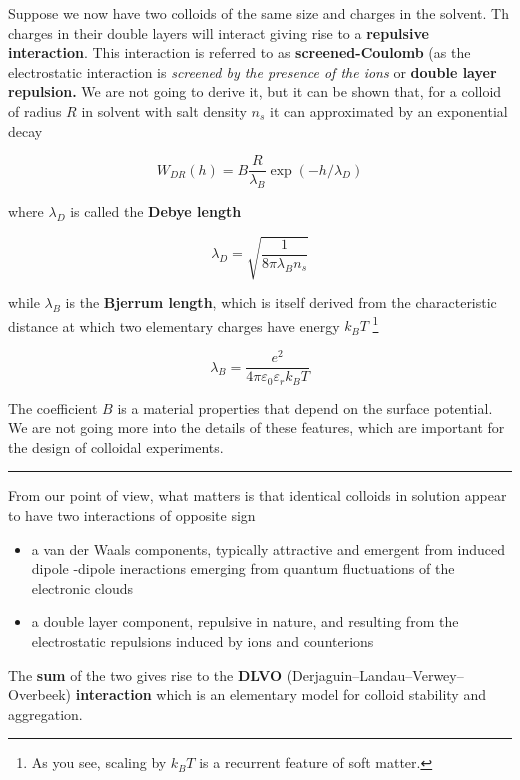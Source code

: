 \documentclass[
  letterpaper,
  enabledeprecatedfontcommands]{report}
\begin{document}
Suppose we now have two colloids of the same size and charges in the
solvent. Th charges in their double layers will interact giving rise to
a \textbf{repulsive interaction}. This interaction is referred to as
\textbf{screened-Coulomb} (as the electrostatic interaction is
\emph{screened by the presence of the ions} or \textbf{double layer
repulsion.} We are not going to derive it, but it can be shown that, for
a colloid of radius \(R\) in solvent with salt density \(n_s\) it can
approximated by an exponential decay

\[
W_{DR}(h) = B\dfrac{R}{\lambda_B}\exp{(-h/\lambda_D)}
\]

where \(\lambda_D\) is called the \textbf{Debye length}

\[
\lambda_D = \sqrt{\dfrac{1}{8\pi\lambda_B n_s}}
\]

while \(\lambda_B\) is the \textbf{Bjerrum length}, which is itself
derived from the characteristic distance at which two elementary charges
have energy \(k_B T\) \footnote{As you see, scaling by \(k_B T\) is a
  recurrent feature of soft matter.}

\[
\lambda_B = \dfrac{e^2}{4\pi \varepsilon_0\varepsilon_r k_B T}
\]

The coefficient \(B\) is a material properties that depend on the
surface potential. We are not going more into the details of these
features, which are important for the design of colloidal experiments.

\begin{center}\rule{0.5\linewidth}{0.5pt}\end{center}

From our point of view, what matters is that identical colloids in
solution appear to have two interactions of opposite sign

\begin{itemize}
\item
  a van der Waals components, typically attractive and emergent from
  induced dipole -dipole ineractions emerging from quantum fluctuations
  of the electronic clouds
\item
  a double layer component, repulsive in nature, and resulting from the
  electrostatic repulsions induced by ions and counterions
\end{itemize}

The \textbf{sum} of the two gives rise to the \textbf{DLVO}
(Derjaguin--Landau--Verwey--Overbeek) \textbf{interaction} which is an
elementary model for colloid stability and aggregation.
\end{document}
